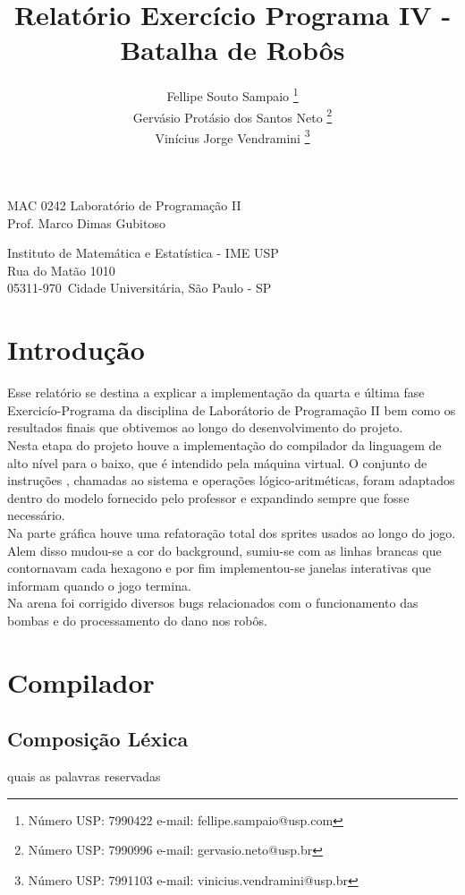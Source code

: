 \documentclass[a4paper]{article}
\title{Relatório Exercício Programa IV - Batalha de Robôs}
\author{
Fellipe Souto Sampaio \footnote{Número USP: 7990422 e-mail: fellipe.sampaio@usp.com}\\
Gervásio Protásio dos Santos Neto \footnote{Número USP: 7990996 e-mail: gervasio.neto@usp.br}\\
Vinícius Jorge Vendramini \footnote{Número USP: 7991103 e-mail: vinicius.vendramini@usp.br}
}
\begin{document}
\maketitle

\begin{center}
MAC 0242 Laboratório de Programa\c{c}ão II \\
Prof. Marco Dimas Gubitoso \\
             
\end{center}

\begin{center}
Instituto de Matemática e Estatística - IME USP \\
 Rua do Matão 1010 \\
 05311-970\, Cidade Universitária, São Paulo - SP \\
\end{center}

\newpage
\tableofcontents
\newpage

\section{Introdução}

Esse relatório se destina a explicar a implementação da quarta e última fase Exercicío-Programa da disciplina de Laborátorio de Programação II bem como os resultados finais que obtivemos ao longo do desenvolvimento do projeto.\\
Nesta etapa do projeto houve a implementação do compilador da linguagem de alto nível para o baixo, que é intendido pela máquina virtual. O conjunto de instruções , chamadas ao sistema e operações lógico-aritméticas, foram adaptados dentro do modelo fornecido pelo professor e expandindo sempre que fosse necessário. \\
Na parte gráfica houve uma refatoração total dos sprites usados ao longo do jogo. Alem disso mudou-se a cor do background, sumiu-se com as linhas brancas que contornavam cada hexagono e por fim implementou-se janelas interativas que informam quando o jogo termina.\\
Na arena foi corrigido diversos bugs relacionados com o funcionamento das bombas e do processamento do dano nos robôs.

\newpage
\section{Compilador}
\subsection{Composição Léxica}
quais as palavras reservadas
\end{document}
